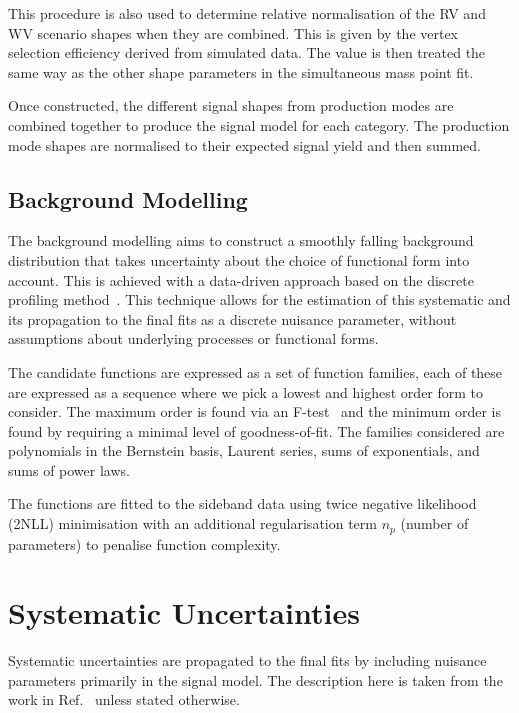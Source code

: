 This procedure is also used to determine relative normalisation of the RV and WV scenario shapes when they are combined. 
This is given by the vertex selection efficiency derived from simulated data. 
The value is then treated the same way as the other shape parameters in the simultaneous mass point fit. 

Once constructed, the different signal shapes from production modes are combined together to produce the signal model for each category. 
The production mode shapes are normalised to their expected signal yield and then summed.



\subsection{Background Modelling}
The background modelling aims to construct a smoothly falling background distribution that takes uncertainty about the choice of functional form into account. This is achieved with a data-driven approach based on the discrete profiling method~\cite{env_method}. This technique allows for the estimation of this systematic and its propagation to the final fits as a discrete nuisance parameter, without assumptions about underlying processes or functional forms. 

The candidate functions are expressed as a set of function families, each of these are expressed as a sequence where we pick a lowest and highest order form to consider. The maximum order is found via an F-test~\cite{FTest} and the minimum order is found by requiring a minimal level of goodness-of-fit. 
The families considered are polynomials in the Bernstein basis, Laurent series, sums of exponentials, and sums of power laws. 

The functions are fitted to the \mgg sideband data using twice negative likelihood (2NLL) minimisation with an additional regularisation term $n_p$ (number of parameters) to penalise function complexity. 



\section{Systematic Uncertainties}
Systematic uncertainties are propagated to the final fits by including nuisance parameters primarily in the signal model. 
The description here is taken from the work in Ref.~\cite{HIG-16-040} unless stated otherwise. 

